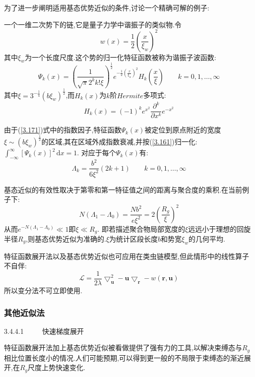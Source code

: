 为了进一步阐明适用基态优势近似的条件,讨论一个精确可解的例子:

一个一维二次势下的链,它是量子力学中谐振子的类似物.令
\begin{equation}
w(x) = \frac{1}{2}(\frac{x}{\xi_w})^2
\end{equation}
其中$\xi_w$为一个长度尺度.这个势的归一化特征函数被称为谐振子波函数:
\begin{equation}
\Psi_k (x) = (\frac{1}{\sqrt{\pi}2^k k! \xi})^{\frac{1}{2}}e^{-\frac{1}{2}(\frac{x}{\xi_w})^2}H_k(\frac{x}{\xi}) \qquad k=0,1,\dots,\infty \label{3.171}
\end{equation}
其中$\xi = 3^{-\frac{1}{4}}(b\xi_w)^{\frac{1}{2}}$,而$H_k (x)$为$k$阶$Hermite$多项式:
\begin{equation}
H_k (x) = (-1)^k e^{x^2}\frac{\partial^k}{\partial x^k}e^{-x^2}
\end{equation}

由于(\ref{3.171})式中的指数因子,特征函数$\Psi_k (x)$被定位到原点附近的宽度$\xi \sim (b\xi_w)^{\frac{1}{2}}$的区域,其在区域外成指数衰减,并按(\ref{3.161})归一化:$\int_{-\infty}^{\infty} [\Psi_k (x)]^2\,\mathrm{d}x = 1$.
对应于每个$\Psi_k (x)$有:
\begin{equation}
\Lambda_k = \frac{b^2}{6\xi^2}(2k+1) \qquad k=0,1,\dots,\infty
\end{equation}

基态近似的有效性取决于第零和第一特征值之间的距离与聚合度的乘积.在当前例子下:
\begin{equation}
N(\Lambda_1-\Lambda_0) = \frac{Nb^2}{e\xi^2} = 2(\frac{R_g}{\xi })^2
\end{equation}
从而$e^{-N(\Lambda_1-\Lambda_0)} \ll 1$即$\xi \ll R_g$.
即若描述聚合物局部宽度的$\xi $远远小于理想的回旋半径$R_g$,则基态优势近似为准确的.$\xi$为统计区段长度$b$和势宽$\xi_w$的几何平均.

特征函数展开法以及基态优势近似也可应用在类虫链模型,但此情形中的线性算子不自伴:
\begin{equation}
\mathcal{L} = \frac{1}{2\lambda}\bigtriangledown^2_\mathbf{u} - \mathbf{u}\bigtriangledown_{\mathbf{r}}-w(\mathbf{r},\mathbf{u})
\end{equation}
所以变分法不可立即使用.

\subsubsection{其他近似法}

3.4.4.1 $\qquad$ 快速梯度展开

特征函数展开法加上基态优势近似被看做提供了强有力的工具,以解决束缚态与$R_g$相比位置长度小的情况.人们可能预期,可以得到更一般的不局限于束缚态的渐近展开,在$R_g$尺度上势快速变化.

